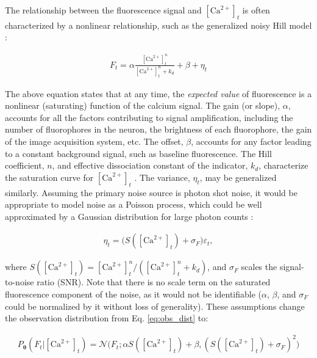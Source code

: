 \documentclass[12pt]{article}
\providecommand{\ve}[1]{\boldsymbol{#1}}
\providecommand{\ve}[1]{\boldsymbol{#1}}
\newcommand{\thetn}{\ve{\theta}}
\newcommand{\p}{P_{\thetn}}
\newcommand{\Ca}{[\text{Ca}^{2+}]}
\begin{document}
The relationship between the fluorescence signal and $\Ca_t$ is often characterized by a nonlinear relationship, such as the generalized noisy Hill model \cite{PologrutoSvoboda04}:

\begin{align} \label{eq:mean_obs}
F_t = \alpha \frac{\Ca_t^n}{\Ca_t^n + k_d} + \beta + \eta_t
\end{align} 

\noindent The above equation states that at any time, the \emph{expected value} of fluorescence is a nonlinear (saturating) function of the calcium signal.  The gain (or slope), $\alpha$, accounts for all the factors contributing to signal amplification, including the number of fluorophores in the neuron, the brightness of each fluorophore, the gain of the image acquisition system, etc.  The offset, $\beta$, accounts for any factor leading to a constant background signal, such as baseline fluorescence. The Hill coefficient, $n$, and effective dissociation constant of the indicator, $k_d$, characterize the saturation curve  for $\Ca_t$ \cite{YasudaSvoboda04}. The variance, $\eta_t$, may be generalized similarly.  Assuming the primary noise source is photon shot noise, it would be appropriate to model noise as a Poisson process, which could be well approximated by a Gaussian distribution for large photon counts \cite{SjulsonMiesenbock07}:

\begin{align} \label{eq:var_obs}
\eta_t = \big(S(\Ca_t) + \sigma_F\big) \varepsilon_t,
\end{align} 

\noindent where $S(\Ca_t)=\Ca_t^n/(\Ca_t^n+k_d)$, and $\sigma_F$ scales the signal-to-noise ratio (SNR). Note that there is no scale term on the saturated fluorescence component of the noise, as it would not be identifiable ($\alpha$, $\beta$, and $\sigma_F$ could be normalized by it without loss of generality). These assumptions change the observation distribution from Eq. \ref{eq:obs_dist} to:

\begin{align} \label{eq:nonlin}
\p(F_t | \Ca_t) = \mathcal{N}\big(F_t; \alpha S(\Ca_t) + \beta, (S(\Ca_t)+\sigma_F)^2\big)
\end{align}
\end{document}
